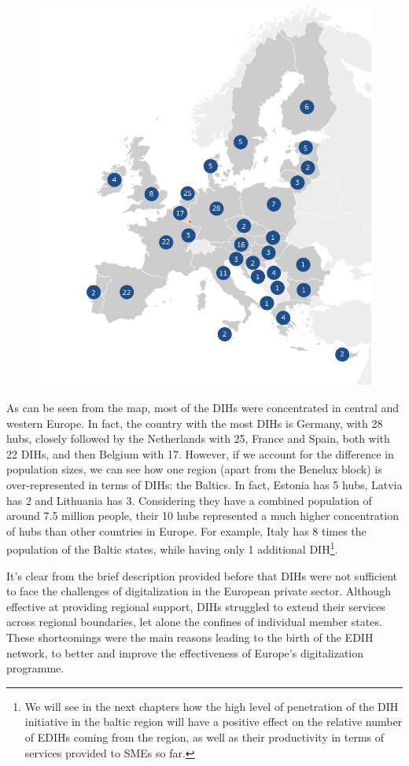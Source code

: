 \documentclass[12pt]{report}
\begin{document}
\begin{figure}
    \centering
    \includegraphics[width=0.6\linewidth]{Figures/01-DIHs_2018.png}
    \caption{}
    \label{fig:enter-label}
\end{figure}

\par As can be seen from the map, most of the DIHs were concentrated in central and western Europe. In fact, the country with the most DIHs is Germany, with 28 hubs, closely followed by the Netherlands with 25, France and Spain, both with 22 DIHs, and then Belgium with 17. However, if we account for the difference in population sizes, we can see how one region (apart from the Benelux block) is over-represented in terms of DIHs: the Baltics. In fact, Estonia has 5 hubs, Latvia has 2 and Lithuania has 3. Considering they have a combined population of around 7.5 million people, their 10 hubs represented a much higher concentration of hubs than other countries in Europe. For example, Italy has 8 times the population of the Baltic states, while having only 1 additional DIH\footnote{We will see in the next chapters how the high level of penetration of the DIH initiative in the baltic region will have a positive effect on the relative number of EDIHs coming from the region, as well as their productivity in terms of services provided to SMEs so far.}.


\par It's clear from the brief description provided before that DIHs were not sufficient to face the challenges of digitalization in the European private sector. Although effective at providing regional support, DIHs struggled to extend their services across regional boundaries, let alone the confines of individual member states. These shortcomings were the main reasons leading to the birth of the EDIH network, to better and improve the effectiveness of Europe's digitalization programme.
\end{document}
